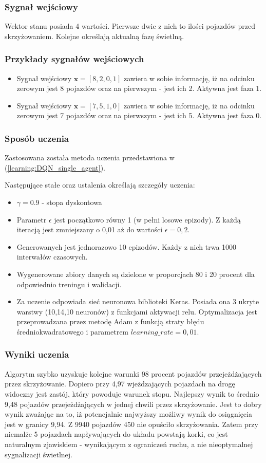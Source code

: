 \documentclass[12pt]{book}
\theoremstyle{plain}
\newcommand{\myref}[1]{(\ref{#1})}
\begin{document}
\subsubsection*{Sygnał wejściowy}
Wektor stanu posiada 4 wartości. Pierwsze dwie z nich to ilości pojazdów przed skrzyżowaniem. Kolejne określają aktualną fazę świetlną.
\subsubsection*{Przykłady sygnałów wejściowych}
\begin{itemize}
	\item Sygnał wejściowy $ \textbf{x}=[8,2,0,1] $ zawiera w sobie informację, iż na odcinku zerowym jest 8 pojazdów oraz na pierwszym - jest ich 2. Aktywna jest faza 1.
		\item Sygnał wejściowy $ \textbf{x}=[7,5,1,0] $ zawiera w sobie informację, iż na odcinku zerowym jest 7 pojazdów oraz na pierwszym - jest ich 5. Aktywna jest faza 0.
\end{itemize}
\subsubsection{Sposób uczenia}
Zastosowana została metoda uczenia przedstawiona w \myref{learning:DQN_single_agent}. 

Następujące stałe oraz ustalenia określają szczegóły uczenia:
\begin{itemize}
	\item $\gamma = 0.9$ - stopa dyskontowa
	\item Parametr $\epsilon$ jest początkowo równy 1 (w pełni losowe epizody). Z każdą iteracją jest zmniejszany o 0,01 aż do wartości $\epsilon=0,2$.
	\item Generowanych jest jednorazowo 10 epizodów. Każdy z nich trwa 1000 interwałów czasowych.
	\item Wygenerowane zbiory danych są dzielone w proporcjach 80 i 20 procent dla odpowiednio treningu i walidacji.
	\item Za uczenie odpowiada sieć neuronowa biblioteki Keras. Posiada ona 3 ukryte warstwy (10,14,10 neuronów) z funkcjami aktywacji relu. Optymalizacja jest przeprowadzana przez metodę Adam z funkcją straty błędu średniokwadratowego i parametrem $learning\_rate = 0,01$. 
\end{itemize}

\subsubsection*{Wyniki uczenia}
Algorytm szybko uzyskuje kolejne warunki 98 procent pojazdów przejeżdżających przez skrzyżowanie. Dopiero przy 4,97 wjeżdzających pojazdach na drogę widoczny jest zastój, który powoduje warunek stopu.
Najlepszy wynik to średnio 9,48 pojazdów przejeżdżających w jednej chwili przez skrzyżowanie. Jest to dobry wynik zważając na to, iż potencjalnie najwyższy możliwy wynik do osiągnięcia jest w granicy 9,94. Z 9940 pojazdów 450 nie opuściło skrzyżowania. Zatem przy niemalże 5 pojazdach napływających do układu powstają korki, co jest naturalnym zjawiskiem - wynikającym z ograniczeń ruchu, a nie nieoptymalnej sygnalizacji świetlnej.
\end{document}
